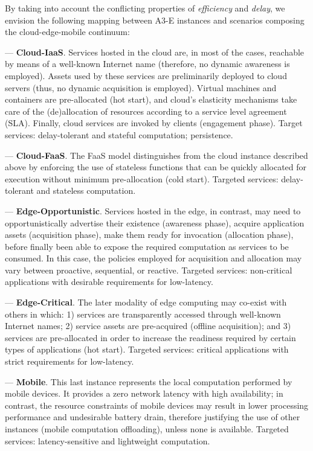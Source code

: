 By taking into account the conflicting properties of \textit{efficiency} and \textit{delay}, we envision the following mapping between A3-E instances and scenarios composing the cloud-edge-mobile continuum:

--- \textbf{Cloud-IaaS}. Services hosted in the cloud are, in most of the cases, reachable by means of a well-known Internet name (therefore, no dynamic awareness is employed). Assets used by these services are preliminarily deployed to cloud servers (thus, no dynamic acquisition is employed). Virtual machines and containers are pre-allocated (hot start), and cloud's elasticity mechanisms take care of the (de)allocation of resources according to a service level agreement (SLA). Finally, cloud services are invoked by clients (engagement phase). Target services: delay-tolerant and stateful computation; persistence.

--- \textbf{Cloud-FaaS}. The FaaS model distinguishes from the cloud instance described above by enforcing the use of stateless functions that can be quickly allocated for execution without minimum pre-allocation (cold start). Targeted services: delay-tolerant and stateless computation.

--- \textbf{Edge-Opportunistic}. Services hosted in the edge, in contrast, may need to opportunistically advertise their existence (awareness phase), acquire application assets (acquisition phase), make them ready for invocation (allocation phase), before finally been able to expose the required computation as services to be consumed. In this case, the policies employed for acquisition and allocation may vary between proactive, sequential, or reactive. Targeted services: non-critical applications with desirable requirements for low-latency.

--- \textbf{Edge-Critical}. The later modality of edge computing may co-exist with others in which: 1) services are transparently accessed through well-known Internet names; 2) service assets are pre-acquired (offline acquisition); and 3) services are pre-allocated in order to increase the readiness required by certain types of applications (hot start). Targeted services: critical applications with strict requirements for low-latency.

--- \textbf{Mobile}. This last instance represents the local computation performed by mobile devices. It provides a zero network latency with high availability; in contrast, the resource constraints of mobile devices may result in lower processing performance and undesirable battery drain, therefore justifying the use of other instances (mobile computation offloading), unless none is available. Targeted services: latency-sensitive and lightweight computation.


